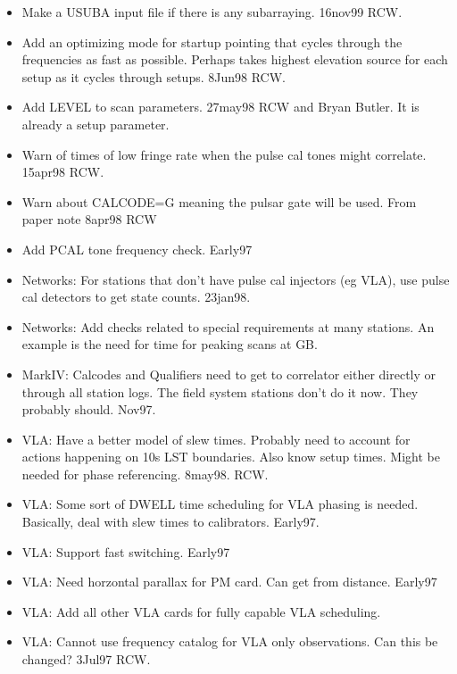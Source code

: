 \documentclass{report}
\begin{document}
\begin{itemize}
\item Make a USUBA input file if there is any subarraying.
      16nov99 RCW.

\item Add an optimizing mode for startup pointing that cycles through
      the frequencies as fast as possible.  Perhaps takes highest
      elevation source for each setup as it cycles through setups.
      8Jun98 RCW.

\item Add LEVEL to scan parameters.  27may98 RCW and Bryan Butler.
      It is already a setup parameter.

\item Warn of times of low fringe rate when the pulse cal tones
      might correlate.  15apr98  RCW.

\item Warn about CALCODE=G meaning the pulsar gate will be used.
      From paper note  8apr98 RCW

\item Add PCAL tone frequency check.  Early97

\item Networks:  For stations that don't have pulse cal injectors (eg VLA),
      use pulse cal detectors to get state counts.  23jan98.

\item Networks:  Add checks related to special requirements at many stations.
      An example is the need for time for peaking scans at GB.

\item MarkIV:  Calcodes and Qualifiers need to get to correlator either
      directly or through all station logs.  The field system
      stations don't do it now.  They probably should.  Nov97.

\item VLA:  Have a better model of slew times.  Probably need to account
      for actions happening on 10s LST boundaries.  Also know setup times.
      Might be needed for phase referencing.  8may98. RCW.

\item VLA:  Some sort of DWELL time scheduling for VLA phasing
      is needed.  Basically, deal with slew times to calibrators.  Early97.

\item VLA:  Support fast switching.  Early97

\item VLA:  Need horzontal parallax for PM card.  Can get from
      distance.  Early97

\item VLA:  Add all other VLA cards for fully capable VLA scheduling.

\item VLA:  Cannot use frequency catalog for VLA only observations.
      Can this be changed?  3Jul97 RCW.

\end{itemize}
\end{document}
